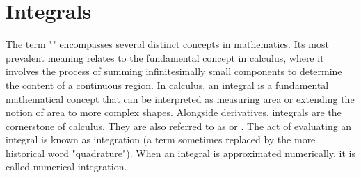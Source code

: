 \section{Integrals}

The term "" encompasses several distinct concepts in mathematics. Its most prevalent meaning relates to the fundamental concept in calculus, where it involves the process of summing infinitesimally small components to determine the content of a continuous region. In calculus, an integral is a fundamental mathematical concept that can be interpreted as measuring area or extending the notion of area to more complex shapes. Alongside derivatives, integrals are the cornerstone of calculus. They are also referred to as  or . The act of evaluating an integral is known as integration (a term sometimes replaced by the more historical word "quadrature"). When an integral is approximated numerically, it is called numerical integration.

